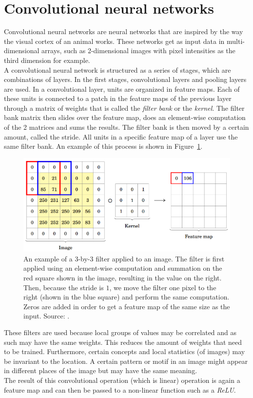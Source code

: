 \section{Convolutional neural networks}
Convolutional neural networks are neural networks that are inspired by the way the visual cortex of an animal works.
These networks get as input data in multi-dimensional arrays, such as 2-dimensional images with pixel intensities as the third dimension for example.\\
A convolutional neural network is structured as a series of stages, which are combinations of layers.
In the first stages, convolutional layers and pooling layers are used.
In a convolutional layer, units are organized in feature maps.
Each of these units is connected to a patch in the feature maps of the previous layer through a matrix of weights that is called the \emph{filter bank} or the \textit{kernel}.
The filter bank matrix then slides over the feature map, does an element-wise computation of the 2 matrices and sums the results.
The filter bank is then moved by a certain amount, called the stride.
All units in a specific feature map of a layer use the same filter bank.
An example of this process is shown in Figure~\ref{fig:cnnfilter}.
\begin{figure}[htb]
    \centering
    \includegraphics[width=.8\linewidth]{images/cnnfilter.png}
    \caption[An example of a 3-by-3 filter applied to an image]{An example of a 3-by-3 filter applied to an image. The filter is first applied using an element-wise computation and summation on the red square shown in the image, resulting in the value on the right. Then, because the stride is $1$, we move the filter one pixel to the right (shown in the blue square) and perform the same computation. Zeros are added in order to get a feature map of the same size as the input. Source: \cite{pavlovsky2017}.}
    \label{fig:cnnfilter}
\end{figure}

These filters are used because local groups of values may be correlated and as such may have the same weights. This reduces the amount of weights that need to be trained. Furthermore, certain concepts and local statistics (of images) may be invariant to the location. A certain pattern or motif in an image might appear in different places of the image but may have the same meaning.\\
The result of this convolutional operation (which is linear) operation is again a feature map and can then be passed to a non-linear function such as a \textit{ReLU}.\\


